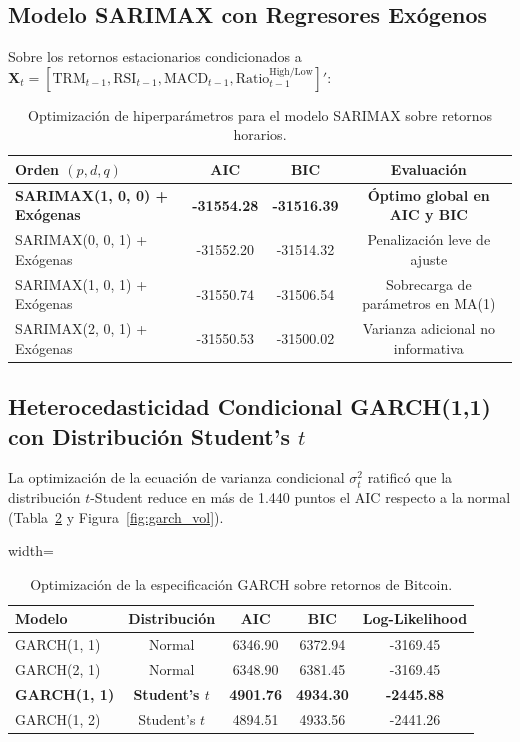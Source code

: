 \documentclass[12pt,letterpaper]{article}
\begin{document}
\subsection{Modelo SARIMAX con Regresores Exógenos}
Sobre los retornos estacionarios condicionados a $\mathbf{X}_t = [\text{TRM}_{t-1}, \text{RSI}_{t-1}, \text{MACD}_{t-1}, \text{Ratio}_{t-1}^{\text{High/Low}}]'$:
\begin{table}[H]
\centering
\caption{Optimización de hiperparámetros para el modelo SARIMAX sobre retornos horarios.}
\label{tab:sarimax_grid}
\begin{tabular}{lccc}
\toprule
\textbf{Orden $(p, d, q)$} & \textbf{AIC} & \textbf{BIC} & \textbf{Evaluación} \\
\midrule
\textbf{SARIMAX(1, 0, 0) + Exógenas} & \textbf{-31554.28} & \textbf{-31516.39} & \textbf{Óptimo global en AIC y BIC} \\
SARIMAX(0, 0, 1) + Exógenas & -31552.20 & -31514.32 & Penalización leve de ajuste \\
SARIMAX(1, 0, 1) + Exógenas & -31550.74 & -31506.54 & Sobrecarga de parámetros en MA(1) \\
SARIMAX(2, 0, 1) + Exógenas & -31550.53 & -31500.02 & Varianza adicional no informativa \\
\bottomrule
\end{tabular}
\end{table}

\subsection{Heterocedasticidad Condicional GARCH(1,1) con Distribución Student's $t$}
La optimización de la ecuación de varianza condicional $\sigma_t^2$ ratificó que la distribución $t$-Student reduce en más de 1.440 puntos el AIC respecto a la normal (Tabla~\ref{tab:garch_grid} y Figura~\ref{fig:garch_vol}).

\begin{table}[H]
\centering
\caption{Optimización de la especificación GARCH sobre retornos de Bitcoin.}
\label{tab:garch_grid}
\begin{adjustbox}{width=\textwidth}
\begin{tabular}{lcccc}
\toprule
\textbf{Modelo} & \textbf{Distribución} & \textbf{AIC} & \textbf{BIC} & \textbf{Log-Likelihood} \\
\midrule
GARCH(1, 1) & Normal & 6346.90 & 6372.94 & -3169.45 \\
GARCH(2, 1) & Normal & 6348.90 & 6381.45 & -3169.45 \\
\textbf{GARCH(1, 1)} & \textbf{Student's $t$} & \textbf{4901.76} & \textbf{4934.30} & \textbf{-2445.88} \\
GARCH(1, 2) & Student's $t$ & 4894.51 & 4933.56 & -2441.26 \\
\bottomrule
\end{tabular}
\end{adjustbox}
\end{table}
\end{document}
